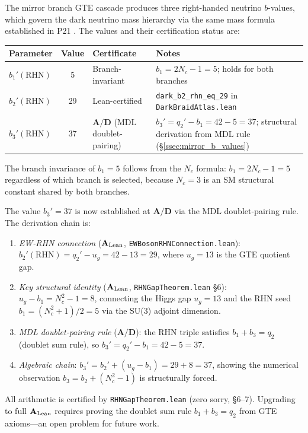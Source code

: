 \documentclass[11pt]{article}
\newcommand{\CatAL}{\ensuremath{\textbf{A}_{\rm Lean}}}
\newcommand{\CatAD}{\textbf{A/D}}
\begin{document}
The mirror branch GTE cascade produces three right-handed neutrino $b$-values, which
govern the dark neutrino mass hierarchy via the same mass formula established in P21
\cite{SpivackNeutrino}. The values and their certification status are:

\begin{center}
\small
\setlength{\tabcolsep}{4pt}
\begin{tabular}{@{}>{\raggedright\arraybackslash}p{2.6cm}cp{2.4cm}>{\raggedright\arraybackslash}p{6.6cm}@{}}
\toprule
Parameter & Value & Certificate & Notes \\
\midrule
$b_1'(\mathrm{RHN})$ & 5 & Branch-invariant & $b_1 = 2N_c - 1 = 5$; holds for both branches \\
$b_2'(\mathrm{RHN})$ & 29 & Lean-certified & \texttt{dark\_b2\_rhn\_eq\_29} in \texttt{DarkBraidAtlas.lean} \\
$b_3'(\mathrm{RHN})$ & 37 & $\CatAD$ (MDL doublet-pairing) & $b_3' = q_2' - b_1 = 42 - 5 = 37$; structural derivation from MDL rule (§\ref{ssec:mirror_b_values}) \\
\bottomrule
\end{tabular}
\end{center}

The branch invariance of $b_1=5$ follows from the $N_c$ formula: $b_1 = 2N_c - 1 = 5$
regardless of which branch is selected, because $N_c=3$ is an SM structural constant
shared by both branches.

The value $b_3'=37$ is now established at $\CatAD$ via the MDL doublet-pairing
rule. The derivation chain is:
\begin{enumerate}[nosep]
\item \emph{EW-RHN connection} ($\CatAL$, \texttt{EWBosonRHNConnection.lean}):
  $b_2'(\mathrm{RHN}) = q_2' - u_g = 42 - 13 = 29$, where $u_g = 13$ is the GTE quotient gap.
\item \emph{Key structural identity} ($\CatAL$, \texttt{RHNGapTheorem.lean} \S6):
  $u_g - b_1 = N_c^2 - 1 = 8$, connecting the Higgs gap $u_g = 13$ and the
  RHN seed $b_1 = (N_c^2+1)/2 = 5$ via the SU(3) adjoint dimension.
\item \emph{MDL doublet-pairing rule} ($\CatAD$): the RHN triple satisfies $b_1 + b_3 = q_2$
  (doublet sum rule), so $b_3' = q_2' - b_1 = 42 - 5 = 37$.
\item \emph{Algebraic chain}: $b_3' = b_2' + (u_g - b_1) = 29 + 8 = 37$,
  showing the numerical observation $b_3 = b_2 + (N_c^2-1)$ is structurally forced.
\end{enumerate}
All arithmetic is certified by \texttt{RHNGapTheorem.lean} (zero sorry, \S6--7).
Upgrading to full $\CatAL$ requires proving the doublet sum rule $b_1+b_3=q_2$
from GTE axioms---an open problem for future work.
\end{document}
